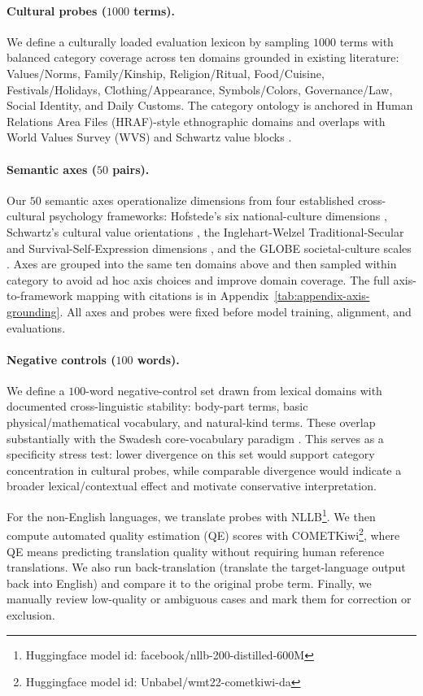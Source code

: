 \documentclass[11pt]{article}
\newcommand{\DomValues}{Values/Norms}
\newcommand{\DomKinship}{Family/Kinship}
\newcommand{\DomReligion}{Religion/Ritual}
\newcommand{\DomFood}{Food/Cuisine}
\newcommand{\DomFestivals}{Festivals/Holidays}
\newcommand{\DomClothing}{Clothing/Appearance}
\newcommand{\DomSymbols}{Symbols/Colors}
\newcommand{\DomGovernance}{Governance/Law}
\newcommand{\DomIdentity}{Social Identity}
\newcommand{\DomDaily}{Daily Customs}
\begin{document}
\paragraph{Cultural probes ($1000$ terms).} We define a culturally loaded evaluation lexicon by sampling $1000$ terms with balanced category coverage across ten domains grounded in existing literature: \DomValues, \DomKinship, \DomReligion, \DomFood, \DomFestivals, \DomClothing, \DomSymbols, \DomGovernance, \DomIdentity, and \DomDaily. The category ontology is anchored in Human Relations Area Files (HRAF)-style ethnographic domains and overlaps with World Values Survey (WVS) and Schwartz value blocks \citep{inglehart2005modernization,schwartz2006theory}.

\paragraph{Semantic axes ($50$ pairs).} Our $50$ semantic axes operationalize dimensions from four established cross-cultural psychology frameworks: Hofstede's six national-culture dimensions \citep{hofstede2001culture}, Schwartz's cultural value orientations \citep{schwartz2006theory}, the Inglehart-Welzel Traditional-Secular and Survival-Self-Expression dimensions \citep{inglehart2005modernization}, and the GLOBE societal-culture scales \citep{house2004culture}. Axes are grouped into the same ten domains above and then sampled within category to avoid ad hoc axis choices and improve domain coverage. The full axis-to-framework mapping with citations is in Appendix~\ref{tab:appendix-axis-grounding}. All axes and probes were fixed before model training, alignment, and evaluations.

\paragraph{Negative controls ($100$ words).} We define a $100$-word negative-control set drawn from lexical domains with documented cross-linguistic stability: body-part terms, basic physical/mathematical vocabulary, and natural-kind terms. These overlap substantially with the Swadesh core-vocabulary paradigm \citep{swadesh1955towards}. This serves as a specificity stress test: lower divergence on this set would support category concentration in cultural probes, while comparable divergence would indicate a broader lexical/contextual effect and motivate conservative interpretation.

For the non-English languages, we translate probes with NLLB\footnote{Huggingface model id: facebook/nllb-200-distilled-600M}. We then compute automated quality estimation (QE) scores with COMETKiwi\footnote{Huggingface model id: Unbabel/wmt22-cometkiwi-da}, where QE means predicting translation quality without requiring human reference translations. We also run back-translation (translate the target-language output back into English) and compare it to the original probe term. Finally, we manually review low-quality or ambiguous cases and mark them for correction or exclusion.
\end{document}
